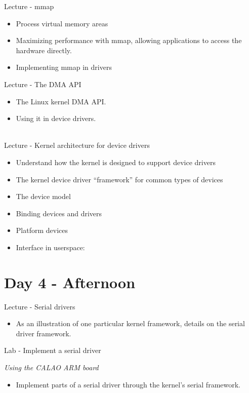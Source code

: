 \documentclass[a4paper,12pt,obeyspaces,spaces,hyphens]{article}
\begin{document}
\feagendatwocolumn
{Lecture - mmap}
{
  \begin{itemize}
  \item Process virtual memory areas
  \item Maximizing performance with mmap, allowing applications to
    access the hardware directly.
  \item Implementing mmap in drivers
  \end{itemize}
}
{Lecture - The DMA API}
{
  \begin{itemize}
  \item The Linux kernel DMA API.
  \item Using it in device drivers.
  \end{itemize}
}
\\
\feagendaonecolumn
{Lecture - Kernel architecture for device drivers}
{
  \begin{itemize}
  \item Understand how the kernel is designed to support device
    drivers
  \item The kernel device driver ``framework'' for common types of
    devices
  \item The device model
  \item Binding devices and drivers
  \item Platform devices
  \item Interface in userspace: 
  \end{itemize}
}

\section{Day 4 - Afternoon}

\feagendatwocolumn
{Lecture - Serial drivers}
{
  \begin{itemize}
  \item As an illustration of one particular kernel framework, details
    on the serial driver framework.
  \end{itemize}
}
{Lab - Implement a serial driver}
{
  {\em Using the CALAO ARM board}
  \begin{itemize}
  \item Implement parts of a serial driver through the kernel's serial
    framework.
  \end{itemize}
}
\end{document}
